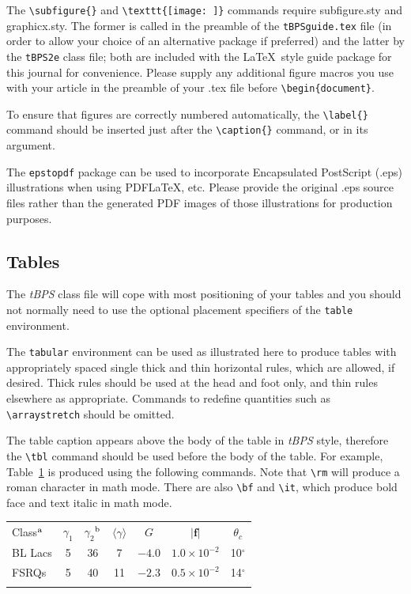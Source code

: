 \documentclass{tBPS2e}
\theoremstyle{plain}
\theoremstyle{definition}
\theoremstyle{remark}
\begin{document}
The \verb"\subfigure{}" and \verb"\texttt{[image: ]}" commands require subfigure.sty and graphicx.sty.
The former is called in the preamble of the \texttt{tBPSguide.tex} file (in order to allow your choice of an alternative package if preferred)
and the latter by the \texttt{tBPS2e} class file; both are included with the \LaTeX\ style guide package for this journal for convenience.
Please supply any additional figure macros you use with your article in the preamble of your .tex file before \verb"\begin{document}".

To ensure that figures are correctly numbered automatically, the \verb"\label{}" command should be inserted just
after the \verb"\caption{}" command, or in its argument.

The \texttt{epstopdf} package can be used to incorporate Encapsulated PostScript (.eps) illustrations when using PDF\LaTeX, etc.
Please provide the original .eps source files rather than the generated PDF images of those illustrations for production purposes.


\subsection{Tables}

The \textit{tBPS} class file will cope with most positioning of your tables and you should not normally need to use the optional
placement specifiers of the \texttt{table} environment.

The \texttt{tabular} environment can be used as illustrated here to produce tables with appropriately spaced single thick and thin
horizontal rules, which are allowed, if desired. Thick rules should be used at the head and foot only, and thin rules elsewhere as appropriate.
Commands to redefine quantities such as \verb"\arraystretch" should be omitted.

The table caption appears above the body of the table in \textit{tBPS} style, therefore the \verb"\tbl" command should be used before the body of the table.
For example, Table~\ref{sample-table} is produced using the following commands. Note that \verb"\rm" will produce a roman character in math mode.
There are also \verb"\bf" and \verb"\it", which produce bold face and text italic in math mode.

\begin{table}
{\begin{tabular}[l]{@{}lcccccc}\toprule
  Class$^{\rm a}$ & $\gamma _1$ & $\gamma _2$$^{\rm b}$
         & $\langle \gamma \rangle$ & $G$ & $|{\bm f}|$ & $\theta _{c}$ \\
\colrule
  BL Lacs & 5 & 36 & 7 & $-4.0$ & $1.0\times 10^{-2}$ & 10$^\circ$ \\
  FSRQs & 5 & 40 & 11 & $-2.3$ & $0.5\times 10^{-2}$ & 14$^\circ$ \\
\botrule
\end{tabular}}
\label{sample-table}
\end{table}
\end{document}
